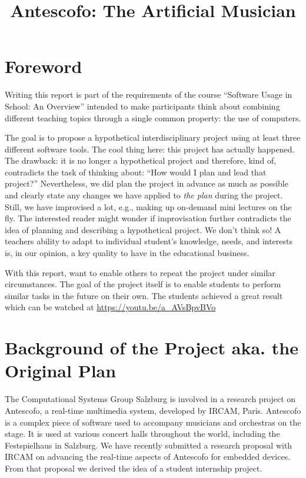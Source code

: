\documentclass[onecolumn,nocopyrightspace,preprint]{sigplanconf}
\title{Antescofo: The Artificial Musician}
\begin{document}
\maketitle




\section{Foreword}  

Writing this report is part of the requirements of the course ``Software Usage
in School: An Overview'' intended to make participants think about combining
different teaching topics through a single common property: the use of
computers.

The goal is to propose a hypothetical interdisciplinary project using at least
three different software tools. The cool thing here: this project has actually
happened. The drawback: it is no longer a hypothetical project and therefore,
kind of, contradicts the task of thinking about: ``How would I plan and lead
that project?'' Nevertheless, we did plan the project in advance as much as
possible and clearly state any changes we have applied  to \textit{the plan}
during the project. Still, we have improvised a lot, e.g., making up on-demand
mini lectures on the fly. The interested reader might wonder if improvisation
further contradicts the idea of planning and describing a hypothetical
project.  We don't think so! A teachers ability to adapt to individual
student's knowledge, needs, and interests is, in our opinion, a key quality to
have in the educational business.

With this report, want to enable others to repeat the project under similar
circumstances. The goal of the project itself is to enable students to perform
similar tasks in the future on their own.  The students achieved a great
result which can be watched at \url{https://youtu.be/a_AVsBpvBVo}

\section{Background of the Project aka. the Original Plan}\label{sec:background}

The Computational Systems Group Salzburg is involved in a research project on
Antescofo, a real-time multimedia system, developed by IRCAM, Paris. Antescofo
is a complex piece of software used to accompany musicians and orchestras on
the stage. It is used at various concert halls throughout the world, including
the Festspielhaus in Salzburg. We have recently submitted a research proposal
with IRCAM on advancing the real-time aspects of Antescofo for embedded
devices. From that proposal we derived the idea of a student internship
project.
\end{document}
